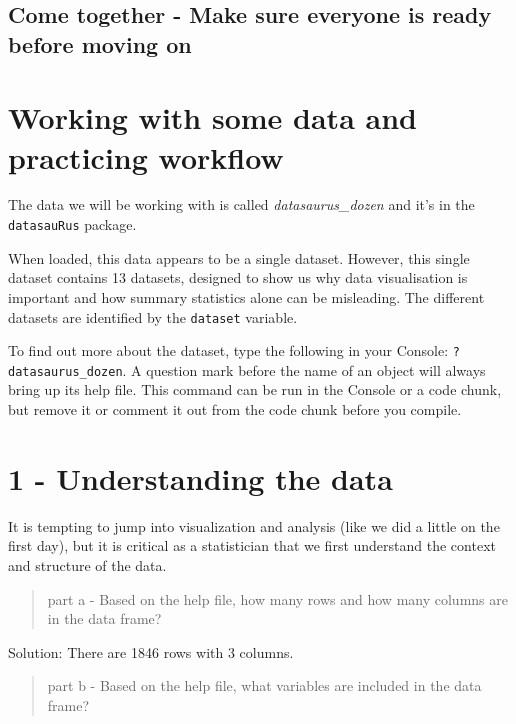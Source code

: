 \documentclass[
  letterpaper,
  DIV=11,
  numbers=noendperiod]{scrartcl}
\begin{document}
\hypertarget{come-together---make-sure-everyone-is-ready-before-moving-on}{%
\subsection{Come together - Make sure everyone is ready before moving
on}\label{come-together---make-sure-everyone-is-ready-before-moving-on}}

\newpage

\hypertarget{working-with-some-data-and-practicing-workflow}{%
\section{Working with some data and practicing
workflow}\label{working-with-some-data-and-practicing-workflow}}

The data we will be working with is called \emph{datasaurus\_dozen} and
it's in the \texttt{datasauRus} package.

When loaded, this data appears to be a single dataset. However, this
single dataset contains 13 datasets, designed to show us why data
visualisation is important and how summary statistics alone can be
misleading. The different datasets are identified by the
\texttt{dataset} variable.

To find out more about the dataset, type the following in your Console:
\texttt{?datasaurus\_dozen}. A question mark before the name of an
object will always bring up its help file. This command can be run in
the Console or a code chunk, but remove it or comment it out from the
code chunk before you compile.

\hypertarget{understanding-the-data}{%
\section{1 - Understanding the data}\label{understanding-the-data}}

It is tempting to jump into visualization and analysis (like we did a
little on the first day), but it is critical as a statistician that we
first understand the context and structure of the data.

\begin{quote}
part a - Based on the help file, how many rows and how many columns are
in the data frame?
\end{quote}

Solution: There are 1846 rows with 3 columns.

\begin{quote}
part b - Based on the help file, what variables are included in the data
frame?
\end{quote}
\end{document}

